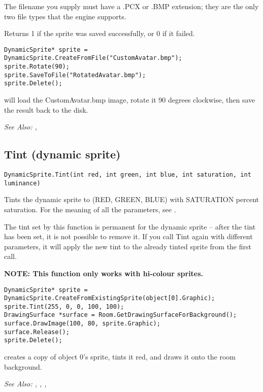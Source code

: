 The filename you supply must have a .PCX or .BMP extension; they are the only
two file types that the engine supports.

Returns 1 if the sprite was saved successfully, or 0 if it failed.

\begin{verbatim}
DynamicSprite* sprite = DynamicSprite.CreateFromFile("CustomAvatar.bmp");
sprite.Rotate(90);
sprite.SaveToFile("RotatedAvatar.bmp");
sprite.Delete();
\end{verbatim}
will load the CustomAvatar.bmp image, rotate it 90 degrees clockwise, then
save the result back to the disk.

\it{See Also:} ,


\subsection{Tint (dynamic sprite)}\label{DynamicSprite.Tint}%

\begin{verbatim}
DynamicSprite.Tint(int red, int green, int blue, int saturation, int luminance)
\end{verbatim}
Tints the dynamic sprite to (RED, GREEN, BLUE) with SATURATION percent
saturation. For the meaning of all the parameters, see .

The tint set by this function is permanent for the dynamic sprite -- after the tint
has been set, it is not possible to remove it. If you call Tint again with different
parameters, it will apply the new tint to the already tinted sprite from the first call.

\bf{NOTE:} This function only works with hi-colour sprites.

\begin{verbatim}
DynamicSprite* sprite = DynamicSprite.CreateFromExistingSprite(object[0].Graphic);
sprite.Tint(255, 0, 0, 100, 100);
DrawingSurface *surface = Room.GetDrawingSurfaceForBackground();
surface.DrawImage(100, 80, sprite.Graphic);
surface.Release();
sprite.Delete();
\end{verbatim}
creates a copy of object 0's sprite, tints it red, and draws it onto the room background.

\it{See Also:} ,
,
,



